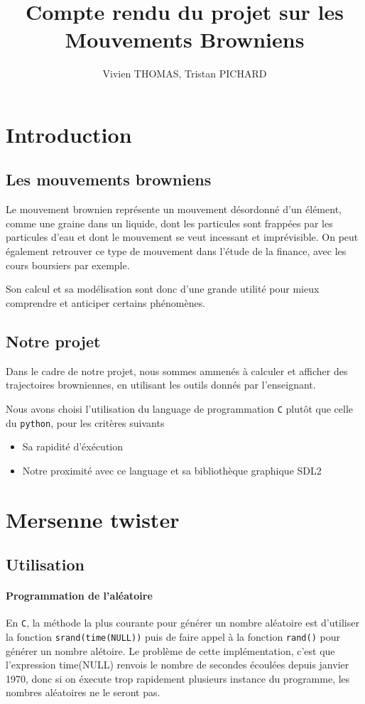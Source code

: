 \documentclass[10pt,a4paper]{article}
\author{Vivien THOMAS, Tristan PICHARD}
\title{Compte rendu du projet sur les Mouvements Browniens}
\begin{document}
\maketitle
\tableofcontents
\section{Introduction}

\subsection{Les mouvements browniens}
Le mouvement brownien représente un mouvement désordonné d'un élément, comme une graine dans un liquide, 
dont les particules sont frappées par les particules d'eau et dont le mouvement se veut incessant et imprévisible.
On peut également retrouver ce type de mouvement dans l'étude de la finance, avec les cours boursiers par exemple.

Son calcul et sa modélisation sont donc d'une grande utilité pour mieux comprendre et anticiper certains phénomènes.

\subsection{Notre projet}
Dans le cadre de notre projet, nous sommes ammenés à calculer et afficher des trajectoires browniennes, en utilisant les outils 
donnés par l'enseignant.

Nous avons choisi l'utilisation du language de programmation \texttt{C} plutôt que celle du \texttt{python}, pour les critères suivants
\begin{itemize}
    \item Sa rapidité d'éxécution
    \item Notre proximité avec ce language et sa bibliothèque graphique SDL2
\end{itemize}
\section{Mersenne twister}
\subsection{Utilisation}
\paragraph{Programmation de l'aléatoire}

En \texttt{C}, la méthode la plus courante pour générer un nombre aléatoire est d'utiliser la fonction \texttt{srand(time(NULL))} 
puis de faire appel à la fonction \texttt{rand()} pour générer un nombre alétoire. Le problème de cette implémentation, 
c'est que l'expression time(NULL) renvois le nombre de secondes écoulées depuis janvier 1970, donc si on éxecute trop rapidement 
plusieurs instance du programme, les nombres aléatoires ne le seront pas.
\end{document}
